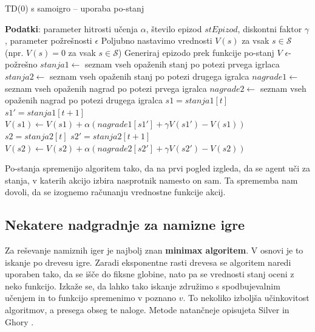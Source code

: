 \documentclass[12pt,a4paper]{amsart}
\theoremstyle{definition} %
\theoremstyle{plain} %
\begin{document}
\begin{algorithm}[H]
    \caption{TD($0$) s samoigro -- uporaba po-stanj}
\begin{algorithmic}\label{samoigra}
    \STATE \textbf{Podatki}: parameter hitrosti učenja $\alpha$, število epizod $stEpizod$, diskontni 
            faktor $\gamma$, parameter požrešnosti $\epsilon$
    \STATE 
    \STATE Poljubno nastavimo vrednosti $V(s)$ za vsak $s \in \mathcal{S}$ (npr. $V(s) = 0$ za vsak $s \in 
            \mathcal{S}$)
    \STATE
        \STATE Generiraj epizodo prek funkcije po-stanj $V$ $\epsilon$-požrešno
        \STATE $stanja1 \leftarrow$ seznam vseh opaženih stanj po potezi prvega igrlaca
        \STATE $stanja2 \leftarrow$ seznam vseh opaženih stanj po potezi drugega igralca
        \STATE $nagrade1 \leftarrow$ seznam vseh opaženih nagrad po potezi prvega igralca
        \STATE $nagrade2 \leftarrow$ seznam vseh opaženih nagrad po potezi drugega igralca
        \STATE
                \STATE $s1 = stanja1[t]$
                \STATE $s1' = stanja1[t + 1]$
                \STATE $V(s1) \leftarrow V(s1) + \alpha (nagrade1[s1'] + \gamma V(s1') - V(s1))$ 
            \ELSE
                \STATE $s2 = stanja2[t]$
                \STATE $s2' = stanja2[t + 1]$
                \STATE $V(s2) \leftarrow V(s2) + \alpha (nagrade2[s2'] + \gamma V(s2') - V(s2))$ 
            \ENDIF
        \ENDFOR
    \ENDFOR
\end{algorithmic}
\end{algorithm}

Po-stanja spremenijo algoritem tako, da na prvi pogled izgleda, da se agent uči za stanja, v katerih 
akcijo izbira nasprotnik namesto on sam. Ta sprememba nam dovoli, da se izognemo računanju vrednostne 
funkcije akcij.

\subsection{Nekatere nadgradnje za namizne igre}
Za reševanje namiznih iger je najbolj znan \textbf{minimax algoritem}. V osnovi je to iskanje po drevesu 
igre. Zaradi eksponentne rasti drevesa se algoritem naredi uporaben tako, da se išče do fiksne globine, 
nato pa se vrednosti stanj oceni z neko funkcijo. Izkaže se, da lahko tako iskanje združimo s 
spodbujevalnim učenjem in to funkcijo spremenimo v poznano $v$. To nekoliko izboljša učinkovitost 
algoritmov, a presega obseg te naloge. Metode natančneje opisujeta Silver \cite{LecNotesSilver} in 
Ghory \cite{RLboard}.
\end{document}
